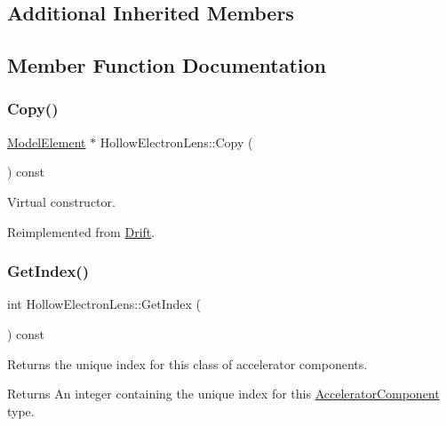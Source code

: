 \subsection*{Additional Inherited Members}


\subsection{Member Function Documentation}
\mbox{\label{classHollowElectronLens_a95d48cbadab7dcc58a1d4c1d9895e8d3}} 
\subsubsection{\texorpdfstring{Copy()}{Copy()}}
{\footnotesize\ttfamily \hyperlink{classModelElement}{Model\+Element} $\ast$ Hollow\+Electron\+Lens\+::\+Copy (\begin{DoxyParamCaption}{ }\end{DoxyParamCaption}) const\hspace{0.3cm}{\ttfamily [virtual]}}

Virtual constructor. 

Reimplemented from \hyperlink{classDrift_ae47df31297596e13944364d602c95ce5}{Drift}.

\mbox{\label{classHollowElectronLens_a87c06909a695e81cb1abc546019e4e40}} 
\subsubsection{\texorpdfstring{Get\+Index()}{GetIndex()}}
{\footnotesize\ttfamily int Hollow\+Electron\+Lens\+::\+Get\+Index (\begin{DoxyParamCaption}{ }\end{DoxyParamCaption}) const\hspace{0.3cm}{\ttfamily [virtual]}}

Returns the unique index for this class of accelerator components. \begin{DoxyReturn}{Returns}
An integer containing the unique index for this \hyperlink{classAcceleratorComponent}{Accelerator\+Component} type. 
\end{DoxyReturn}


